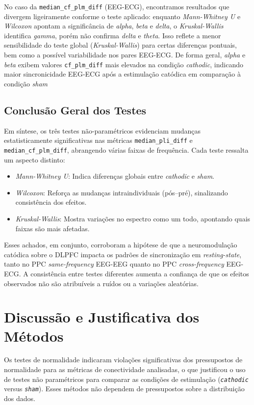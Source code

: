 No caso da \texttt{median\_cf\_plm\_diff} (EEG-ECG), encontramos resultados que divergem ligeiramente conforme o teste aplicado: enquanto \textit{Mann-Whitney U} e \textit{Wilcoxon} apontam a significância de \textit{alpha}, \textit{beta} e \textit{delta}, o \textit{Kruskal-Wallis} identifica \textit{gamma}, porém não confirma \textit{delta} e \textit{theta}. Isso reflete a menor sensibilidade do teste global (\textit{Kruskal-Wallis}) para certas diferenças pontuais, bem como a possível variabilidade nos pares EEG-ECG. De forma geral, \textit{alpha} e \textit{beta} exibem valores \texttt{cf\_plm\_diff} mais elevados na condição \textit{cathodic}, indicando maior sincronicidade EEG-ECG após a estimulação catódica em comparação à condição \textit{sham}


\subsection{Conclusão Geral dos Testes}
Em síntese, os três testes não-paramétricos evidenciam mudanças estatisticamente significativas nas métricas \texttt{median\_pli\_diff} e \texttt{median\_cf\_plm\_diff}, abrangendo várias faixas de frequência. Cada teste ressalta um aspecto distinto:
\begin{itemize}
    \item \textit{Mann-Whitney U}: Indica diferenças globais entre \textit{cathodic} e \textit{sham}.
    \item \textit{Wilcoxon}: Reforça as mudanças intraindividuais (pós--pré), sinalizando consistência dos efeitos.
    \item \textit{Kruskal-Wallis}: Mostra variações no espectro como um todo, apontando quais faixas são mais afetadas.
\end{itemize}

Esses achados, em conjunto, corroboram a hipótese de que a neuromodulação catódica sobre o DLPFC impacta os padrões de sincronização em \textit{resting-state}, tanto no PPC \textit{same-frequency} EEG-EEG quanto no PPC \textit{cross-frequency} EEG-ECG. A consistência entre testes diferentes aumenta a confiança de que os efeitos observados não são atribuíveis a ruídos ou a variações aleatórias.

\section{Discussão e Justificativa dos Métodos}
Os testes de normalidade indicaram violações significativas dos pressupostos de normalidade para as métricas de conectividade analisadas, o que justificou o uso de testes não paramétricos para comparar as condições de estimulação (\texttt{\textit{cathodic}} versus \texttt{\textit{sham}}). Esses métodos não dependem de pressupostos sobre a distribuição dos dados.

